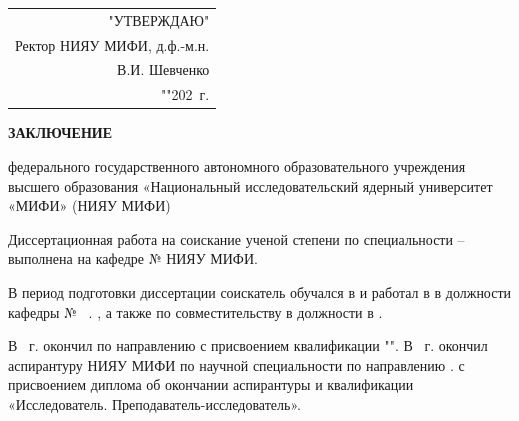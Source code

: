     \begin{table}[h!]
        \raggedleft
            \begin{tabular}{r}
                "УТВЕРЖДАЮ" \\[5pt]
                Ректор НИЯУ МИФИ, д.ф.-м.н. \\[5pt]
                \uline{\hspace{6em}} В.И. Шевченко \\[5pt]
                "\uline{\hspace{1em}}"\uline{\hspace{8em}}202\uline{\hspace{1em}}~г.
            \end{tabular}
    \end{table}

    \vspace{5mm}

    \begin{tightcenter}
        \textbf{ЗАКЛЮЧЕНИЕ}
        
        федерального государственного автономного образовательного учреждения высшего образования «Национальный исследовательский ядерный университет «МИФИ» (НИЯУ МИФИ)

    \end{tightcenter}

    \vspace{5mm}

    Диссертационная работа   на соискание ученой степени  по специальности  –  выполнена на кафедре №   НИЯУ МИФИ.

    В период подготовки диссертации соискатель  обучался в  и работал в  в должности  кафедры №~ 
    \ifnum{}
        .
    \else
        , а также по совместительству в должности  в .
    \fi

    В ~г. окончил   по направлению    с присвоением квалификации "". В ~г.  окончил аспирантуру НИЯУ МИФИ по научной специальности   по направлению 
    \ifnum{}
        .
    \else
         с присвоением диплома об окончании аспирантуры и квалификации «Исследователь. Преподаватель-исследователь».
    \fi

